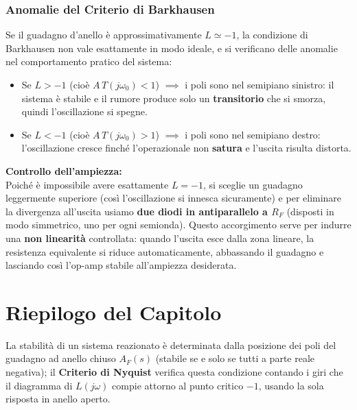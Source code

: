 \subsubsection*{Anomalie del Criterio di Barkhausen}
Se il guadagno d'anello è approssimativamente $L \simeq -1$, la condizione di Barkhausen non vale esattamente in modo ideale, e si verificano delle anomalie nel comportamento pratico del sistema:
\begin{itemize}[itemsep=1.5ex]
    \item Se $L > -1$ (cioè $A\,T(j\omega_0) < 1$) $\implies$ i poli sono nel semipiano sinistro: il sistema è stabile e il rumore produce solo un \textbf{transitorio} che si smorza, quindi l'oscillazione si spegne.
    \item Se $L < -1$ (cioè $A\,T(j\omega_0) > 1$) $\implies$ i poli sono nel semipiano destro: l'oscillazione cresce finché l'operazionale non \textbf{satura} e l'uscita risulta distorta.
\end{itemize}

\begin{important}
\textbf{Controllo dell'ampiezza:} \\
Poiché è impossibile avere esattamente $L=-1$, si sceglie un guadagno leggermente superiore (così l'oscillazione si innesca sicuramente) e per eliminare la divergenza all'uscita usiamo \textbf{due diodi in antiparallelo a $R_F$} (disposti in modo simmetrico, uno per ogni semionda). Questo accorgimento serve per indurre una \textbf{non linearità} controllata: quando l'uscita esce dalla zona lineare, la resistenza equivalente si riduce automaticamente, abbassando il guadagno e lasciando così l'op-amp stabile all'ampiezza desiderata.
\end{important}

\section*{Riepilogo del Capitolo}

\begin{important}
La stabilità di un sistema reazionato è determinata dalla posizione dei poli del guadagno ad anello chiuso $A_F(s)$ (stabile se e solo se tutti a parte reale negativa); il \textbf{Criterio di Nyquist} verifica questa condizione contando i giri che il diagramma di $L(j\omega)$ compie attorno al punto critico $-1$, usando la sola risposta in anello aperto.
\end{important}

